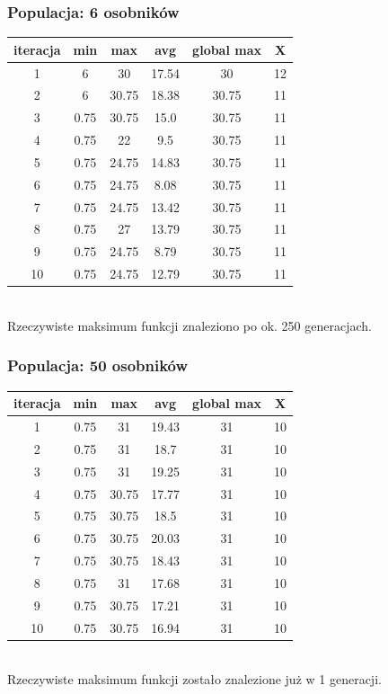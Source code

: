 \documentclass[a4paper,11pt]{article}
\begin{document}
			\subsubsection{Populacja: 6 osobników}
				\begin{tabular}{|c|c|c|c|c|c|}
					\hline 
					iteracja &  min &  max & avg & global max &  X\\
					\hline
					1 & 6 & 30 & 17.54 & 30 & 12\\
					\hline
					2 & 6 & 30.75 & 18.38 & 30.75 & 11\\
					\hline
					3 & 0.75 & 30.75 & 15.0 & 30.75 & 11\\
					\hline
					4 & 0.75 & 22 &  9.5 & 30.75 & 11\\
					\hline
					5 & 0.75 & 24.75 & 14.83 & 30.75 & 11\\
					\hline
					6 & 0.75 & 24.75 & 8.08 & 30.75 & 11\\
					\hline
					7 & 0.75 & 24.75 & 13.42 & 30.75 & 11\\
					\hline
					8 & 0.75 & 27 & 13.79 & 30.75 & 11\\
					\hline
					9 & 0.75 & 24.75 & 8.79 & 30.75 & 11\\
					\hline
					10 & 0.75 & 24.75 & 12.79 & 30.75 & 11\\
					\hline
				\end{tabular} \\
				Rzeczywiste maksimum funkcji znaleziono po ok. 250 generacjach.
			\subsubsection{Populacja: 50 osobników}
				\begin{tabular}{|c|c|c|c|c|c|}
					\hline 
					iteracja &  min &  max & avg & global max &  X\\
					\hline
					1 & 0.75 & 31 & 19.43 & 31 & 10\\
					\hline
					2 & 0.75 & 31 & 18.7 & 31 & 10\\
					\hline
					3 & 0.75 & 31 & 19.25 & 31 & 10\\
					\hline
					4 & 0.75 & 30.75 & 17.77 & 31 & 10\\
					\hline
					5 & 0.75 & 30.75 & 18.5 & 31 & 10\\
					\hline
					6 & 0.75 & 30.75 & 20.03 & 31 & 10\\
					\hline
					7 & 0.75 & 30.75 & 18.43 & 31 & 10\\
					\hline
					8 & 0.75 & 31 & 17.68 & 31 & 10\\
					\hline
					9 & 0.75 & 30.75 & 17.21 & 31 & 10\\
					\hline
					10 & 0.75 & 30.75 & 16.94 & 31 & 10\\
					\hline
				\end{tabular} \\
				Rzeczywiste maksimum funkcji zostało znalezione już w 1 generacji.
\end{document}

